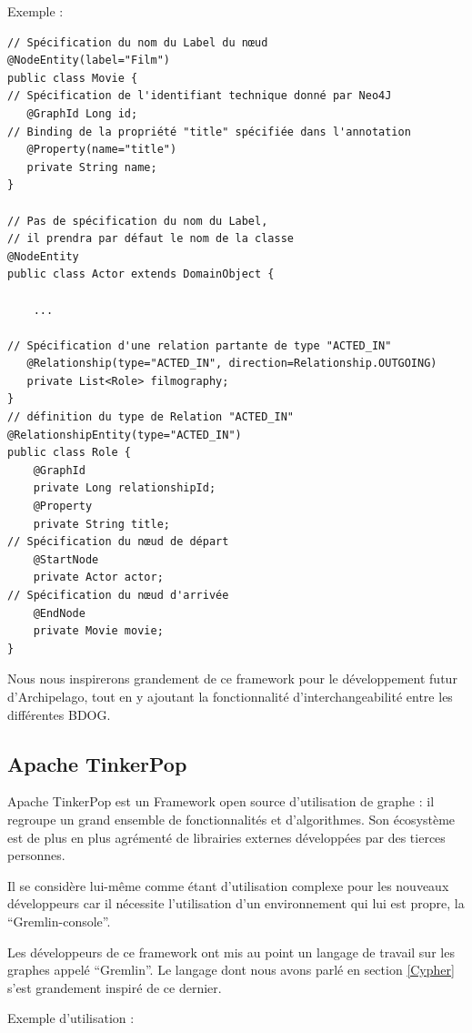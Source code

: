 \documentclass[a4paper,fleqn,12pt,oneside]{report}
\begin{document}
Exemple : 

\begin{lstlisting}
// Spécification du nom du Label du nœud
@NodeEntity(label="Film")
public class Movie {
// Spécification de l'identifiant technique donné par Neo4J
   @GraphId Long id;
// Binding de la propriété "title" spécifiée dans l'annotation
   @Property(name="title")
   private String name;
}

// Pas de spécification du nom du Label, 
// il prendra par défaut le nom de la classe
@NodeEntity
public class Actor extends DomainObject {

	... 
	
// Spécification d'une relation partante de type "ACTED_IN"
   @Relationship(type="ACTED_IN", direction=Relationship.OUTGOING)
   private List<Role> filmography;
}
// définition du type de Relation "ACTED_IN" 
@RelationshipEntity(type="ACTED_IN")
public class Role {
    @GraphId   
    private Long relationshipId;
    @Property  
    private String title;
// Spécification du nœud de départ
    @StartNode 
    private Actor actor;
// Spécification du nœud d'arrivée
    @EndNode   
    private Movie movie;
}
\end{lstlisting}
Nous nous inspirerons grandement de ce framework pour le développement futur d'Archipelago, tout en y ajoutant la fonctionnalité d'interchangeabilité entre les différentes BDOG. 

\subsection{Apache TinkerPop}

Apache TinkerPop est un Framework open source d’utilisation de graphe : il regroupe un grand ensemble de fonctionnalités et d’algorithmes. Son écosystème est de plus en plus agrémenté de librairies externes développées par des tierces personnes.

Il se considère lui-même comme étant d’utilisation complexe pour les nouveaux développeurs car il nécessite l’utilisation d’un environnement qui lui est propre, la \enquote{Gremlin-console}.

Les développeurs de ce framework ont mis au point un langage de travail sur les graphes appelé \enquote{Gremlin}. Le langage dont nous avons parlé en section \ref{Cypher} s’est grandement inspiré de ce dernier\cite{tinkerPopSite}.

Exemple d'utilisation :
\end{document}
